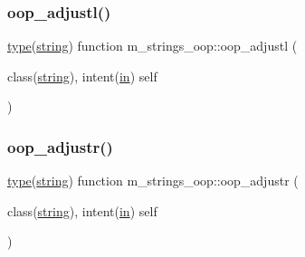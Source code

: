 \subsubsection{\texorpdfstring{oop\+\_\+adjustl()}{oop\_adjustl()}}
{\footnotesize\ttfamily \hyperlink{stop__watch_83_8txt_a70f0ead91c32e25323c03265aa302c1c}{type}(\hyperlink{structm__strings__oop_1_1string}{string}) function m\+\_\+strings\+\_\+oop\+::oop\+\_\+adjustl (\begin{DoxyParamCaption}\item[{class(\hyperlink{structm__strings__oop_1_1string}{string}), intent(\hyperlink{M__journal_83_8txt_afce72651d1eed785a2132bee863b2f38}{in})}]{self }\end{DoxyParamCaption})\hspace{0.3cm}{\ttfamily [private]}}

\mbox{\label{namespacem__strings__oop_abb0dfa5646259e4fc768700eada111ac}} 
\subsubsection{\texorpdfstring{oop\+\_\+adjustr()}{oop\_adjustr()}}
{\footnotesize\ttfamily \hyperlink{stop__watch_83_8txt_a70f0ead91c32e25323c03265aa302c1c}{type}(\hyperlink{structm__strings__oop_1_1string}{string}) function m\+\_\+strings\+\_\+oop\+::oop\+\_\+adjustr (\begin{DoxyParamCaption}\item[{class(\hyperlink{structm__strings__oop_1_1string}{string}), intent(\hyperlink{M__journal_83_8txt_afce72651d1eed785a2132bee863b2f38}{in})}]{self }\end{DoxyParamCaption})\hspace{0.3cm}{\ttfamily [private]}}

\mbox{\label{namespacem__strings__oop_ac02aecbaebcf57833b544de4f50c89a6}} 
